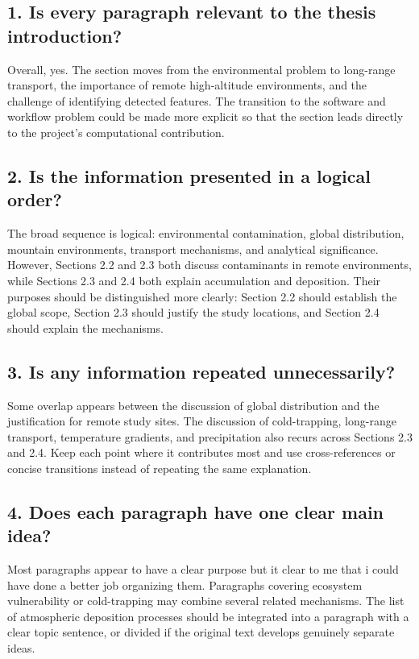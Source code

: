 \documentclass[11pt]{article}
\begin{document}
\begin{doublespace}
    \subsection*{1. Is every paragraph relevant to the thesis introduction?}
        Overall, yes. The section moves from the environmental problem to long-range transport, the importance of remote high-altitude environments, and the challenge of identifying detected features. The transition to the software and workflow problem could be made more explicit so that the section leads directly to the project's computational contribution.

    \subsection*{2. Is the information presented in a logical order?}
        The broad sequence is logical: environmental contamination, global distribution, mountain environments, transport mechanisms, and analytical significance. However, Sections 2.2 and 2.3 both discuss contaminants in remote environments, while Sections 2.3 and 2.4 both explain accumulation and deposition. Their purposes should be distinguished more clearly: Section 2.2 should establish the global scope, Section 2.3 should justify the study locations, and Section 2.4 should explain the mechanisms.

    \subsection*{3. Is any information repeated unnecessarily?}
        Some overlap appears between the discussion of global distribution and the justification for remote study sites. The discussion of cold-trapping, long-range transport, temperature gradients, and precipitation also recurs across Sections 2.3 and 2.4. Keep each point where it contributes most and use cross-references or concise transitions instead of repeating the same explanation.

    \subsection*{4. Does each paragraph have one clear main idea?}
        Most paragraphs appear to have a clear purpose but it clear to me that i could have done a better job organizing them. Paragraphs covering ecosystem vulnerability or cold-trapping may combine several related mechanisms. The list of atmospheric deposition processes should be integrated into a paragraph with a clear topic sentence, or divided if the original text develops genuinely separate ideas.


\end{doublespace}
\end{document}

